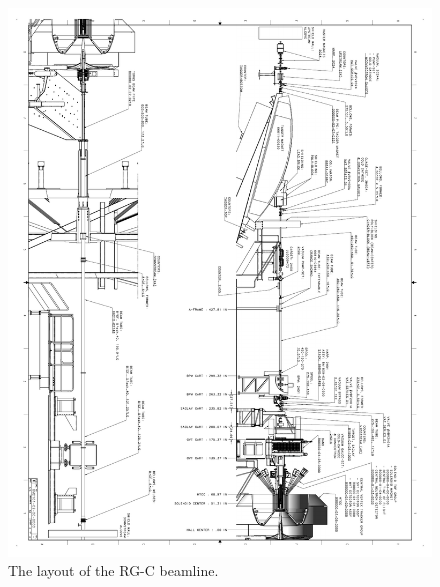 \documentclass[12pt]{article}
\begin{document}
\begin{figure}[hbt]
\vspace{-2cm}
\begin{center}
\includegraphics[width=6in]{rgm_beam_page2.pdf}
\end{center}
\caption{ \label{fig:beamline2} 
The layout of the RG-C beamline. }
\end{figure}
\end{document}
